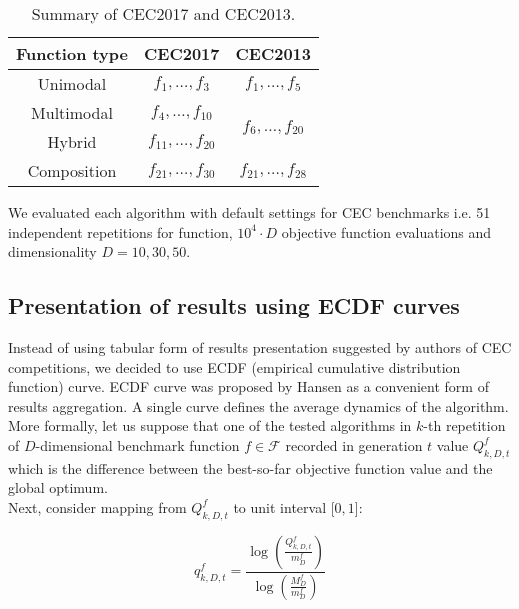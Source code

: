 \documentclass[runningheads,a4paper]{llncs}
\newcommand{\ffrac}[2]{\ensuremath{\frac{\displaystyle #1}{\displaystyle #2}}}
\begin{document}
\begin{table}[H]
\centering
\begin{tabular}{|c|c|c|l|l|l|}
\hline
Function type & CEC2017                 & \multicolumn{4}{c|}{CEC2013}                                 \\ \hline
Unimodal      & $f_1, \dots, f_3$       & \multicolumn{4}{c|}{$f_1, \dots, f_5$}                       \\ \hline
Multimodal    & $f_4, \dots, f_{10}$    & \multicolumn{4}{c|}{\multirow{2}{*}{$f_{6}, \dots, f_{20}$}} \\ \cline{1-2}
Hybrid        & $f_{11}, \dots, f_{20}$ & \multicolumn{4}{c|}{}                                        \\ \hline
Composition   & $f_{21}, \dots, f_{30}$ & \multicolumn{4}{c|}{$f_{21}, \dots, f_{28}$}                 \\ \hline
\end{tabular}
\caption{Summary of CEC2017 and CEC2013.}
\label{cec-table}
\end{table}

We evaluated each algorithm with default settings for CEC benchmarks i.e. 51 independent repetitions for function, $10^{4}\cdot D$ objective function evaluations and dimensionality $D = 10, 30, 50$.

\subsection{Presentation of results using ECDF curves}

Instead of using tabular form of results presentation suggested by authors of CEC competitions, we decided to use ECDF (empirical cumulative distribution function) curve.
ECDF curve was proposed by Hansen \cite{Hansen-ecdf} as a convenient form of results aggregation. A single curve defines the average dynamics of the algorithm.
\\
More formally, let us suppose that one of the tested algorithms in $k$-th repetition of $D$-dimensional benchmark function $f \in \mathcal{F}$ recorded in generation $t$ value $Q^{f}_{k, D, t}$ 
which is the difference between the best-so-far objective function value and the global optimum. \\
Next, consider mapping from $Q^{f}_{k, D, t}$ to unit interval $[0, 1$]:

\begin{equation}
  q^{f}_{k, D, t} = \ffrac{\log\left(\frac{Q^{f}_{k, D, t}}{m^{f}_{D}}\right)}{\log\left(\frac{M^{f}_{D}}{m^{f}_{D}}\right)}
\end{equation}
\end{document}
